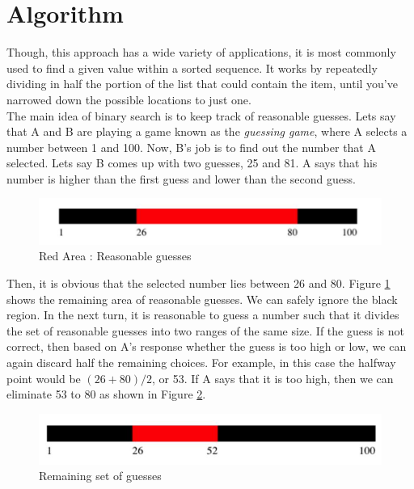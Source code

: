 \documentclass{article}
\begin{document}
\section{Algorithm}
Though, this approach has a wide variety of applications, it is most commonly used to find a given value within a sorted sequence.
It works by repeatedly dividing in half the portion of the list that could contain the item, until you've narrowed down the possible locations to just one.\cite{khan} \\

The main idea of binary search is to keep track of reasonable guesses. Lets say that A and B are playing a game known as the \textit{guessing game}, where A selects a number between 1 and 100.
Now, B's job is to find out the number that A selected. Lets say B comes up with two guesses, 25 and 81. A says that his number is higher than the first guess and lower than the second guess.

\begin{figure}[h!]
\begin{center}
\includegraphics[width=0.5\columnwidth]{one1.jpg}
\caption{Red Area : Reasonable guesses}
\label{fig:one}
\end{center}
\end{figure}

Then, it is obvious that the selected number lies between 26 and 80. Figure \ref{fig:one} shows the remaining area of reasonable guesses. We can safely ignore the black region.
In the next turn, it is reasonable to guess a number such that it divides the set of reasonable guesses into two ranges of the same size. If the guess is not correct, then based on A's response whether the guess is too high or low, we can again discard half the remaining choices. 
For example, in this case the halfway point would be $(26+80)/2$, or 53. If A says that it is too high, then we can eliminate 53 to 80 as shown in Figure \ref{fig:two}.
\begin{figure}[h!]
\begin{center}
\includegraphics[width=0.47\columnwidth]{two2.jpg}
\caption{Remaining set of guesses}
\label{fig:two}
\end{center}
\end{figure}
\end{document}
